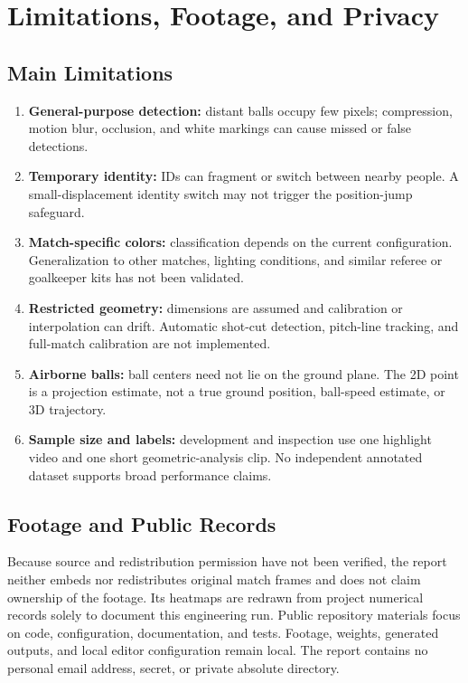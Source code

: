 \documentclass[11pt,a4paper]{article}
\begin{document}
\section{Limitations, Footage, and Privacy}

\subsection{Main Limitations}

\begin{enumerate}
  \item \textbf{General-purpose detection:} distant balls occupy few pixels;
        compression, motion blur, occlusion, and white markings can cause
        missed or false detections.
  \item \textbf{Temporary identity:} IDs can fragment or switch between nearby
        people. A small-displacement identity switch may not trigger the
        position-jump safeguard.
  \item \textbf{Match-specific colors:} classification depends on the current
        configuration. Generalization to other matches, lighting conditions,
        and similar referee or goalkeeper kits has not been validated.
  \item \textbf{Restricted geometry:} dimensions are assumed and calibration
        or interpolation can drift. Automatic shot-cut detection, pitch-line
        tracking, and full-match calibration are not implemented.
  \item \textbf{Airborne balls:} ball centers need not lie on the ground plane.
        The 2D point is a projection estimate, not a true ground position,
        ball-speed estimate, or 3D trajectory.
  \item \textbf{Sample size and labels:} development and inspection use one
        highlight video and one short geometric-analysis clip.
        No independent annotated dataset supports broad performance claims.
\end{enumerate}

\subsection{Footage and Public Records}

Because source and redistribution permission have not been verified,
the report neither embeds nor redistributes original match frames and does
not claim ownership of the footage.
Its heatmaps are redrawn from project numerical records solely to document
this engineering run.
Public repository materials focus on code, configuration, documentation,
and tests. Footage, weights, generated outputs, and local editor configuration
remain local. The report contains no personal email address, secret, or private
absolute directory.
\end{document}

